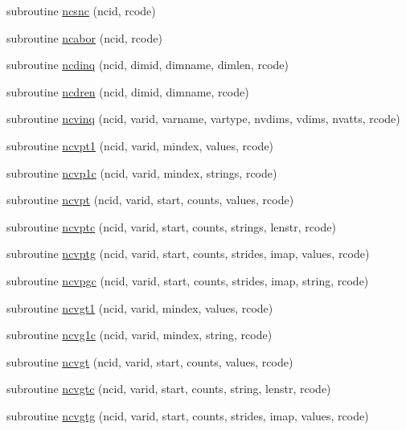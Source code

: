 \begin{DoxyCompactItemize}
subroutine \hyperlink{nf__fortv2_8f90_a64e09d2a2a1ccf7e9052b111a169c2b9}{ncsnc} (ncid, rcode)
\item 
subroutine \hyperlink{nf__fortv2_8f90_a0e25c674ad6b99068e8c95d7f34f3c8e}{ncabor} (ncid, rcode)
\item 
subroutine \hyperlink{nf__fortv2_8f90_a6ee036c798e7436b1d962c7dfc8a6957}{ncdinq} (ncid, dimid, dimname, dimlen, rcode)
\item 
subroutine \hyperlink{nf__fortv2_8f90_ade22791003f60c336b970147d68ceae3}{ncdren} (ncid, dimid, dimname, rcode)
\item 
subroutine \hyperlink{nf__fortv2_8f90_a58c204fe024e1315e38a953ffc8bb3c9}{ncvinq} (ncid, varid, varname, vartype, nvdims, vdims, nvatts, rcode)
\item 
subroutine \hyperlink{nf__fortv2_8f90_a193fa468237c9fe5b4c4182a49ae0030}{ncvpt1} (ncid, varid, mindex, values, rcode)
\item 
subroutine \hyperlink{nf__fortv2_8f90_ae86fd9a6227f59f53db68f523802428c}{ncvp1c} (ncid, varid, mindex, strings, rcode)
\item 
subroutine \hyperlink{nf__fortv2_8f90_a0e80dc4b1c7ad7772f48f31480a61237}{ncvpt} (ncid, varid, start, counts, values, rcode)
\item 
subroutine \hyperlink{nf__fortv2_8f90_a6c95aa587ee368266d7727735158957f}{ncvptc} (ncid, varid, start, counts, strings, lenstr, rcode)
\item 
subroutine \hyperlink{nf__fortv2_8f90_aacf3b20901c252480d87dc327cf6a9f5}{ncvptg} (ncid, varid, start, counts, strides, imap, values, rcode)
\item 
subroutine \hyperlink{nf__fortv2_8f90_ae593f10084ce6b3ed716b1dcf87d6618}{ncvpgc} (ncid, varid, start, counts, strides, imap, string, rcode)
\item 
subroutine \hyperlink{nf__fortv2_8f90_a6c63eb6533f6fd980258f9ded00cf4e1}{ncvgt1} (ncid, varid, mindex, values, rcode)
\item 
subroutine \hyperlink{nf__fortv2_8f90_ab8326c1d1a7aa3142428092a708f6a10}{ncvg1c} (ncid, varid, mindex, string, rcode)
\item 
subroutine \hyperlink{nf__fortv2_8f90_a376e4bb1238c7da316b25b32d34608f7}{ncvgt} (ncid, varid, start, counts, values, rcode)
\item 
subroutine \hyperlink{nf__fortv2_8f90_a81ac17ea93b907a54fc2557bf3ace40a}{ncvgtc} (ncid, varid, start, counts, string, lenstr, rcode)
\item 
subroutine \hyperlink{nf__fortv2_8f90_ae0fbe2588278893dcab19ab604767a7d}{ncvgtg} (ncid, varid, start, counts, strides, imap, values, rcode)

\end{DoxyCompactItemize}
